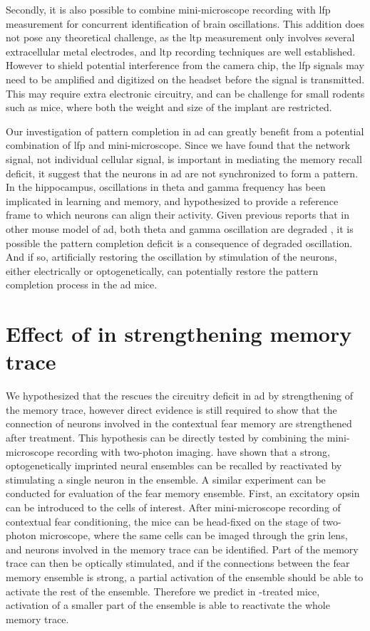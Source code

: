 Secondly, it is also possible to combine mini-microscope recording with \gls{lfp} measurement for concurrent identification of brain oscillations. This addition does not pose any theoretical challenge, as the \gls{ltp} measurement only involves several extracellular metal electrodes, and \gls{ltp} recording techniques are well established. However to shield potential interference from the camera chip, the \gls{lfp} signals may need to be amplified and digitized on the headset before the signal is transmitted. This may require extra electronic circuitry, and can be challenge for small rodents such as mice, where both the weight and size of the implant are restricted. 

Our investigation of pattern completion in \gls{ad} can greatly benefit from a potential combination of \gls{lfp} and mini-microscope. Since we have found that the network signal, not individual cellular signal, is important in mediating the memory recall deficit, it suggest that the neurons in \gls{ad} are not synchronized to form a pattern. In the hippocampus, oscillations in theta and gamma frequency has been implicated in learning and memory, and hypothesized to provide a reference frame to which neurons can align their activity. Given previous reports that in other mouse model of \gls{ad}, both theta and gamma oscillation are degraded \citep{driver07, villette10, scott12, goutagny13}, it is possible the pattern completion deficit is a consequence of degraded oscillation. And if so, artificially restoring the oscillation by stimulation of the neurons, either electrically or optogenetically, can potentially restore the pattern completion process in the \gls{ad} mice. 


\section{Effect of \tglu{} in strengthening memory trace}

We hypothesized that the \tglu{} rescues the circuitry deficit in \gls{ad} by strengthening of the memory trace, however direct evidence is still required to show that the connection of neurons involved in the contextual fear memory are strengthened after \tglu{} treatment. This hypothesis can be directly tested by combining the mini-microscope recording with two-photon imaging. \citet{carrillo-reid16} have shown that a strong, optogenetically imprinted neural ensembles can be recalled by reactivated by stimulating a single neuron in the ensemble. A similar experiment can be conducted for evaluation of the fear memory ensemble. First, an excitatory opsin can be introduced to the cells of interest. After mini-microscope recording of contextual fear conditioning, the mice can be head-fixed on the stage of two-photon microscope, where the same cells can be imaged through the \gls{grin} lens, and neurons involved in the memory trace can be identified. Part of the memory trace can then be optically stimulated, and if the connections between the fear memory ensemble is strong, a partial activation of the ensemble should be able to activate the rest of the ensemble. Therefore we predict in \tglu{}-treated mice, activation of a smaller part of the ensemble is able to reactivate the whole memory trace. 

